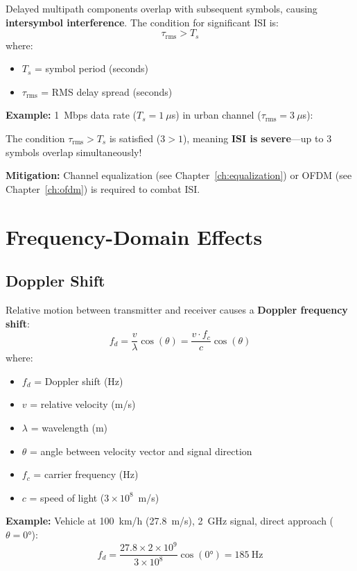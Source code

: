 Delayed multipath components overlap with subsequent symbols, causing \textbf{intersymbol interference}. The condition for significant ISI is:
\begin{equation}
\tau_{\text{rms}} > T_s
\end{equation}
where:
\begin{itemize}
\item $T_s$ = symbol period (seconds)
\item $\tau_{\text{rms}}$ = RMS delay spread (seconds)
\end{itemize}

\textbf{Example:} 1~Mbps data rate ($T_s = 1~\mu$s) in urban channel ($\tau_{\text{rms}} = 3~\mu$s):

The condition $\tau_{\text{rms}} > T_s$ is satisfied ($3 > 1$), meaning \textbf{ISI is severe}---up to 3 symbols overlap simultaneously!

\textbf{Mitigation:} Channel equalization (see Chapter~\ref{ch:equalization}) or OFDM (see Chapter~\ref{ch:ofdm}) is required to combat ISI.

\section{Frequency-Domain Effects}

\subsection{Doppler Shift}

Relative motion between transmitter and receiver causes a \textbf{Doppler frequency shift}:
\begin{equation}
f_d = \frac{v}{\lambda} \cos(\theta) = \frac{v \cdot f_c}{c} \cos(\theta)
\end{equation}
where:
\begin{itemize}
\item $f_d$ = Doppler shift (Hz)
\item $v$ = relative velocity (m/s)
\item $\lambda$ = wavelength (m)
\item $\theta$ = angle between velocity vector and signal direction
\item $f_c$ = carrier frequency (Hz)
\item $c$ = speed of light ($3 \times 10^8$~m/s)
\end{itemize}

\textbf{Example:} Vehicle at 100~km/h (27.8~m/s), 2~GHz signal, direct approach ($\theta = 0°$):
\begin{equation}
f_d = \frac{27.8 \times 2 \times 10^9}{3 \times 10^8} \cos(0°) = 185~\text{Hz}
\end{equation}

